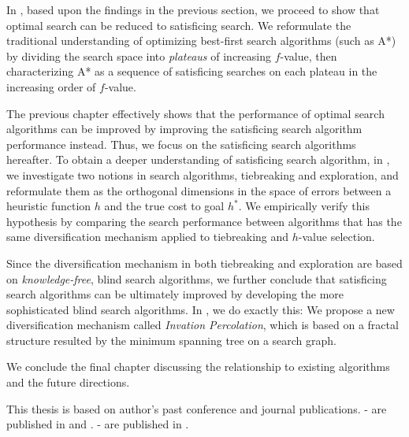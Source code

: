 In , based upon the findings in the previous section,
we proceed to show that optimal search can be reduced to satisficing
search. We reformulate the traditional understanding of optimizing
best-first search algorithms (such as A*) by dividing the search space
into \emph{plateaus} of increasing $f$-value, then characterizing A* as a
sequence of satisficing searches on each plateau in the increasing order
of $f$-value.

The previous chapter effectively shows that the performance of optimal
search algorithms can be improved by improving the satisficing search
algorithm performance instead.
Thus, we focus on the satisficing search algorithms hereafter.
To obtain a deeper understanding of satisficing search algorithm,
in , we investigate two notions in search algorithms,
tiebreaking and exploration,
and reformulate them as the orthogonal dimensions in the space
of errors between a heuristic function $h$ and the true cost to goal $h^*$.
We empirically verify this hypothesis by comparing the search performance between algorithms
that has the same diversification mechanism applied to tiebreaking and $h$-value selection.

Since the diversification mechanism in both tiebreaking and exploration
are based on \emph{knowledge-free}, blind search algorithms, we further
conclude that satisficing search algorithms can be ultimately improved
by developing the more sophisticated blind search algorithms.
In , we do exactly this: We propose a new
diversification mechanism called \emph{Invation Percolation}, which is
based on a fractal structure resulted by the minimum spanning tree on a
search graph.

We conclude the final chapter discussing the relationship to existing
algorithms and the future directions.

This thesis is based on author's past conference and journal publications.
- are published in \cite{Asai2016} and \cite{asai2017tie}.
- are published in \cite{Asai2017b}.
